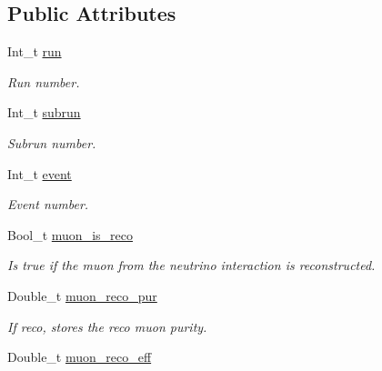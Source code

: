\subsection*{Public Attributes}
\begin{DoxyCompactItemize}
\item 
\hypertarget{classUBXSecEvent_ad26e1c100cfe11d9f7c48a3760cdcc07}{Int\-\_\-t \hyperlink{classUBXSecEvent_ad26e1c100cfe11d9f7c48a3760cdcc07}{run}}\label{classUBXSecEvent_ad26e1c100cfe11d9f7c48a3760cdcc07}

\begin{DoxyCompactList}\small\item\em Run number. \end{DoxyCompactList}\item 
\hypertarget{classUBXSecEvent_a15ac0be3ec941ed67ee78d27da704abb}{Int\-\_\-t \hyperlink{classUBXSecEvent_a15ac0be3ec941ed67ee78d27da704abb}{subrun}}\label{classUBXSecEvent_a15ac0be3ec941ed67ee78d27da704abb}

\begin{DoxyCompactList}\small\item\em Subrun number. \end{DoxyCompactList}\item 
\hypertarget{classUBXSecEvent_a5833c043eb96d5d41935cd1c6eaec722}{Int\-\_\-t \hyperlink{classUBXSecEvent_a5833c043eb96d5d41935cd1c6eaec722}{event}}\label{classUBXSecEvent_a5833c043eb96d5d41935cd1c6eaec722}

\begin{DoxyCompactList}\small\item\em Event number. \end{DoxyCompactList}\item 
\hypertarget{classUBXSecEvent_a429e2c8750cdd32b073548b73c5ebd68}{Bool\-\_\-t \hyperlink{classUBXSecEvent_a429e2c8750cdd32b073548b73c5ebd68}{muon\-\_\-is\-\_\-reco}}\label{classUBXSecEvent_a429e2c8750cdd32b073548b73c5ebd68}

\begin{DoxyCompactList}\small\item\em Is true if the muon from the neutrino interaction is reconstructed. \end{DoxyCompactList}\item 
\hypertarget{classUBXSecEvent_ac1391d470b732d86bb9e462d49fff185}{Double\-\_\-t \hyperlink{classUBXSecEvent_ac1391d470b732d86bb9e462d49fff185}{muon\-\_\-reco\-\_\-pur}}\label{classUBXSecEvent_ac1391d470b732d86bb9e462d49fff185}

\begin{DoxyCompactList}\small\item\em If reco, stores the reco muon purity. \end{DoxyCompactList}\item 
\hypertarget{classUBXSecEvent_aa713bc31919706a03a5a11034dcbda7c}{Double\-\_\-t \hyperlink{classUBXSecEvent_aa713bc31919706a03a5a11034dcbda7c}{muon\-\_\-reco\-\_\-eff}}\label{classUBXSecEvent_aa713bc31919706a03a5a11034dcbda7c}


\end{DoxyCompactItemize}

